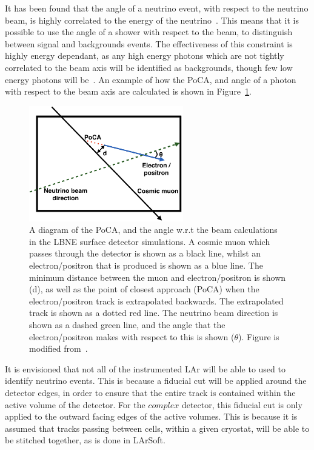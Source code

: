 It has been found that the angle of a neutrino event, with respect to the neutrino beam, is highly correlated to the energy of the neutrino~\citep{barker2012muon}. This means that it is possible to use the angle of a shower with respect to the beam, to distinguish between signal and backgrounds events. The effectiveness of this constraint is highly energy dependant, as any high energy photons which are not tightly correlated to the beam axis will be identified as backgrounds, though few low energy photons will be~\citep{LBNE6621}. An example of how the PoCA, and angle of a photon with respect to the beam axis are calculated is shown in Figure~\ref{fig:SurfPoCACut}. \\

\begin{figure}
  \centering
  \includegraphics[width=0.6\textwidth]{PoCA_Beam_Cuts}
  \caption[A diagram of the PoCA, and the angle w.r.t the beam calculations in the LBNE surface detector simulations]
          {A diagram of the PoCA, and the angle w.r.t the beam calculations in the LBNE surface detector simulations. A cosmic muon which passes through the detector is shown as a black line, whilst an electron/positron that is produced is shown as a blue line. The minimum distance between the muon and electron/positron is shown (d), as well as the point of closest approach (PoCA) when the electron/positron track is extrapolated backwards. The extrapolated track is shown as a dotted red line. The neutrino beam direction is shown as a dashed green line, and the angle that the electron/positron makes with respect to this is shown ($\theta$). Figure is modified from~\citep{MartinsThesis}.}
  \label{fig:SurfPoCACut}
\end{figure}

It is envisioned that not all of the instrumented LAr will be able to used to identify neutrino events. This is because a fiducial cut will be applied around the detector edges, in order to ensure that the entire track is contained within the active volume of the detector. For the $complex$ detector, this fiducial cut is only applied to the outward facing edges of the active volumes. This is because it is assumed that tracks passing between cells, within a given cryostat, will be able to be stitched together, as is done in LArSoft. \\

